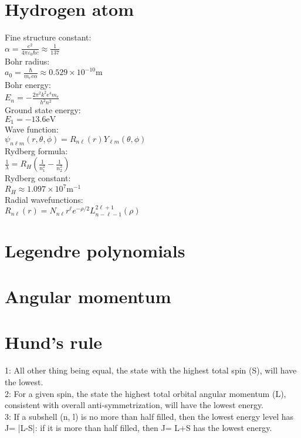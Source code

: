 \documentclass[12pt,a4paper]{article}
\begin{document}
\section*{Hydrogen atom}
\begin{center}
	Fine structure constant:\\
	$\alpha = \frac{e^2}{4\pi \varepsilon_0 \hbar c} \approx \frac{1}{137}$\\
	Bohr radius:\\
	$a_0 = \frac{\hbar}{m_e c \alpha} \approx 0.529 \times 10^{-10} \text{m}$\\
	Bohr energy:\\
	$E_n = -\frac{2\pi^2 k^2 e^4 m_e}{h^2 n^2}$\\
	Ground state energy:\\
	$E_1 = -13.6 \text{eV}$\\
	Wave function:\\
	$\psi_{n\ell m}(r, \theta, \phi) = R_{n\ell}(r) Y_{\ell m}(\theta, \phi)$\\
	Rydberg formula:\\
	$\frac{1}{\lambda} = R_H \left( \frac{1}{n_1^2} - \frac{1}{n_2^2} \right)$\\
	Rydberg constant:\\
	$R_H \approx 1.097 \times 10^7 \text{m}^{-1}$\\
	Radial wavefunctions:\\
	$R_{n\ell}(r) = N_{n\ell} r^\ell e^{-\rho/2} L^{2\ell + 1}_{n-\ell-1}(\rho)$\\
	
\end{center}


\section*{Legendre polynomials}

\section*{Angular momentum}


\section*{Hund's rule}
1: All other thing being equal, the state with the highest total spin (S), will have the lowest.\\
2: For a given spin, the state the highest total orbital angular momentum (L), consistent with overall anti-symmetrization, will have the lowest energy.\\
3: If a subshell (n, l) is no more than half filled, then the lowest energy level has J= |L-S|: if it is more than half filled, then J= L+S has the lowest energy.\\
\end{document}
